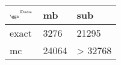 \begin{tabular}{lll}
    \toprule
    $_{\text{\tiny{\ggn}}}$$^{\text{\tiny{Data}}}$ & mb & sub \\
    \midrule
    exact & 3276
              & 21295 \\
    mc   & 24064
              & > 32768 \\
    \bottomrule
\end{tabular}